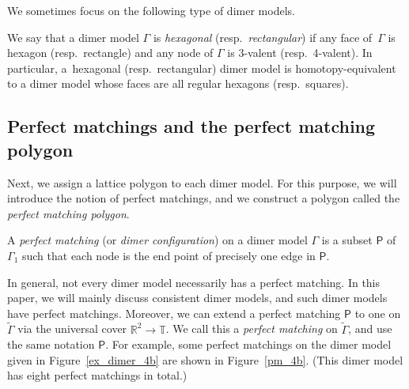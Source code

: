 \documentclass[pdftex]{sigma}%
\numberwithin{equation}{section}
\numberwithin{figure}{section}
\numberwithin{table}{section}
\newcommand{\RR}{\mathbb{R}}
\newcommand{\TT}{\mathbb{T}}
\newcommand{\sfP}{\mathsf{P}}
\begin{document}
We sometimes focus on the following type of dimer models.

\begin{Definition}\label{def_hexagonal_square}
We say that a dimer model $\Gamma$ is \emph{hexagonal} (resp.\ \emph{rectangular})
if any face of~$\Gamma$ is hexagon (resp.\ rectangle) and any node of $\Gamma$ is $3$-valent (resp.\ 4-valent).
In particular, a~hexagonal (resp.\ rectangular) dimer model is homotopy-equivalent to a dimer model whose faces are all regular hexagons (resp.\ squares).
\end{Definition}

\subsection{Perfect matchings and the perfect matching polygon}\label{subsection_PM}

Next, we assign a lattice polygon to each dimer model.
For this purpose, we will introduce the notion of perfect matchings, and we construct a polygon called the \emph{perfect matching polygon}.

\begin{Definition}A \emph{perfect matching} (or \emph{dimer configuration}) on a dimer model $\Gamma$ is a subset $\sfP$ of $\Gamma_1$ such that each node is
the end point of precisely one edge in $\sfP$.
\end{Definition}

In general, not every dimer model necessarily has a perfect matching.
In this paper, we will mainly discuss consistent dimer models, and such dimer models have perfect matchings.
Moreover, we can extend a perfect matching $\sfP$ to one on $\widetilde{\Gamma}$ via the universal cover $\RR^2\rightarrow\TT$.
We call this a \emph{perfect matching} on $\widetilde{\Gamma}$, and use the same notation $\sfP$.
For example, some perfect matchings on the dimer model given in Figure~\ref{ex_dimer_4b} are shown in Figure~\ref{pm_4b}.
(This dimer model has eight perfect matchings in total.)
\end{document}
